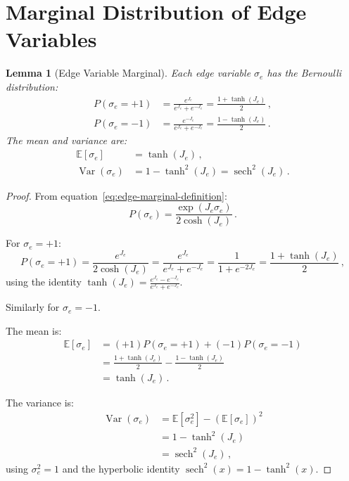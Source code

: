 \documentclass[11pt]{article}
\newtheorem{lemma}[theorem]{Lemma}
\theoremstyle{definition}
\theoremstyle{remark}
\begin{document}
\section{Marginal Distribution of Edge Variables}

\begin{lemma}[Edge Variable Marginal]
\label{lem:edge-marginal}
Each edge variable $\sigma_e$ has the Bernoulli distribution:
\begin{align}
P(\sigma_e = +1) &= \frac{e^{J_e}}{e^{J_e} + e^{-J_e}}
= \frac{1 + \tanh(J_e)}{2}\,, \label{eq:sigma-plus} \\
P(\sigma_e = -1) &= \frac{e^{-J_e}}{e^{J_e} + e^{-J_e}}
= \frac{1 - \tanh(J_e)}{2}\,. \label{eq:sigma-minus}
\end{align}
The mean and variance are:
\begin{align}
\mathbb{E}[\sigma_e] &= \tanh(J_e)\,, \label{eq:edge-mean} \\
\operatorname{Var}(\sigma_e) &= 1 - \tanh^2(J_e)
= \operatorname{sech}^2(J_e)\,. \label{eq:edge-variance}
\end{align}
\end{lemma}

\begin{proof}
From equation~\eqref{eq:edge-marginal-definition}:
\begin{equation}
P(\sigma_e) = \frac{\exp(J_e \sigma_e)}{2\cosh(J_e)}\,.
\end{equation}

For $\sigma_e = +1$:
\begin{equation}
P(\sigma_e = +1) = \frac{e^{J_e}}{2\cosh(J_e)}
= \frac{e^{J_e}}{e^{J_e} + e^{-J_e}}
= \frac{1}{1 + e^{-2J_e}}
= \frac{1 + \tanh(J_e)}{2}\,,
\end{equation}
using the identity
$\tanh(J_e) = \frac{e^{J_e} - e^{-J_e}}{e^{J_e} + e^{-J_e}}$.

Similarly for $\sigma_e = -1$.

The mean is:
\begin{align}
\mathbb{E}[\sigma_e]
&= (+1) P(\sigma_e = +1) + (-1) P(\sigma_e = -1) \nonumber\\
&= \frac{1 + \tanh(J_e)}{2} - \frac{1 - \tanh(J_e)}{2} \nonumber\\
&= \tanh(J_e)\,.
\end{align}

The variance is:
\begin{align}
\operatorname{Var}(\sigma_e)
&= \mathbb{E}[\sigma_e^2] - (\mathbb{E}[\sigma_e])^2 \nonumber\\
&= 1 - \tanh^2(J_e) \nonumber\\
&= \operatorname{sech}^2(J_e)\,,
\end{align}
using $\sigma_e^2 = 1$ and the hyperbolic identity
$\operatorname{sech}^2(x) = 1 - \tanh^2(x)$.
\end{proof}
\end{document}
